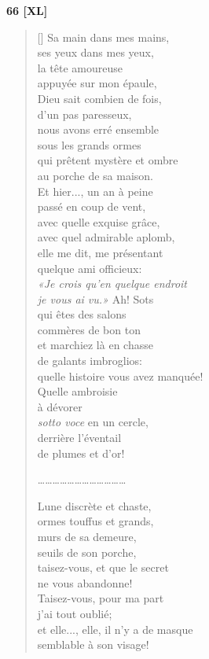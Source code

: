 \documentclass[a4paper,12pt]{book}
\begin{document}
\bigskip

\begin{center}
  \textbf{66 [XL]}
\end{center}

\settowidth{\versewidth}{Sa main dans mes mains,}

\begin{verse}[\versewidth]
  Sa main dans mes mains, \\
  ses yeux dans mes yeux, \\
  la tête amoureuse \\
  appuyée sur mon épaule, \\
  Dieu sait combien de fois, \\
  d'un pas paresseux, \\
  nous avons erré ensemble \\
  sous les grands ormes \\
  qui prêtent mystère et ombre \\
  au porche de sa maison. \\
  Et hier..., un an à peine \\
  passé en coup de vent, \\
  avec quelle exquise grâce, \\
  avec quel admirable aplomb, \\
  elle me dit, me présentant  \\
  quelque ami officieux: \\
  \emph{«Je crois qu'en quelque endroit \\
    je vous ai vu.»} Ah! Sots \\
  qui êtes des salons \\
  commères de bon ton \\
  et marchiez là en chasse \\
  de galants imbroglios: \\
  quelle histoire vous avez manquée! \\
  Quelle ambroisie \\
  à dévorer \\
  \emph{sotto voce} en un cercle, \\
  derrière l'éventail \\
  de plumes et d'or!

\ldots\ldots\ldots\ldots\ldots\ldots\ldots\ldots\ldots\ldots\ldots\ldots

  Lune discrète et chaste, \\
  ormes touffus et grands, \\
  murs de sa demeure, \\
  seuils de son porche, \\
  taisez-vous, et que le secret \\
  ne vous abandonne! \\
  Taisez-vous, pour ma part \\
  j'ai tout oublié; \\
  et elle..., elle, il n'y a de masque \\
  semblable à son visage!
\end{verse}
\end{document}
